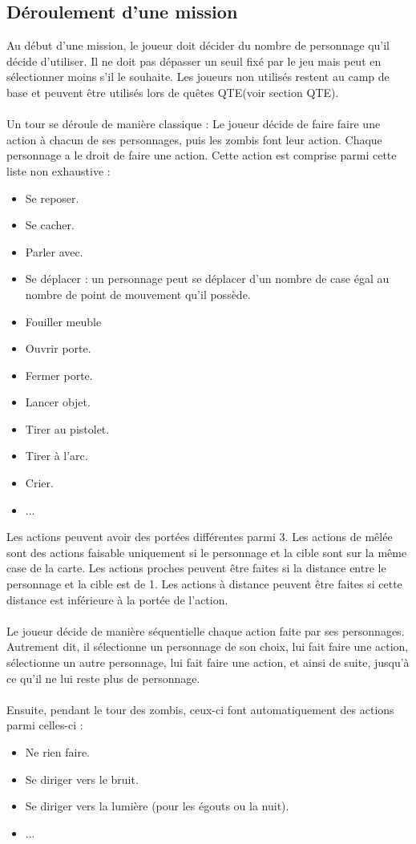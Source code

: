 \subsection{Déroulement d'une mission}
Au début d'une mission, le joueur doit décider du nombre de personnage qu'il décide d'utiliser. Il ne doit pas dépasser un seuil fixé par le jeu mais peut en sélectionner moins s'il le souhaite. Les joueurs non utilisés restent au camp de base et peuvent être utilisés lors de quêtes QTE(voir section QTE).
\\\\
Un tour se déroule de manière classique : Le joueur décide de faire faire une action à chacun de ses personnages, puis les zombis font leur action. Chaque personnage a le droit de faire une action. Cette action est comprise parmi cette liste non exhaustive :
\begin{itemize}
  \item Se reposer.
  \item Se cacher.
  \item Parler avec.
  \item Se déplacer : un personnage peut se déplacer d'un nombre de case égal au nombre de point de mouvement qu'il possède.
  \item Fouiller meuble
  \item Ouvrir porte.
  \item Fermer porte.
  \item Lancer objet.
  \item Tirer au pistolet.
  \item Tirer à l'arc.
  \item Crier.
  \item ...
\end{itemize}
Les actions peuvent avoir des portées différentes parmi 3. Les actions de mêlée sont des actions faisable uniquement si le personnage et la cible sont sur la même case de la carte. Les actions proches peuvent être faites si la distance entre le personnage et la cible est de 1. Les actions à distance peuvent être faites si cette distance est inférieure à la portée de l'action.
\\\\
Le joueur décide de manière séquentielle chaque action faite par ses personnages. Autrement dit, il sélectionne un personnage de son choix, lui fait faire une action, sélectionne un autre personnage, lui fait faire une action, et ainsi de suite, jusqu'à ce qu'il ne lui reste plus de personnage.
\\\\
Ensuite, pendant le tour des zombis, ceux-ci font automatiquement des actions parmi celles-ci :
\begin{itemize}
  \item Ne rien faire.
  \item Se diriger vers le bruit.
  \item Se diriger vers la lumière (pour les égouts ou la nuit).
  \item ...
\end{itemize}
